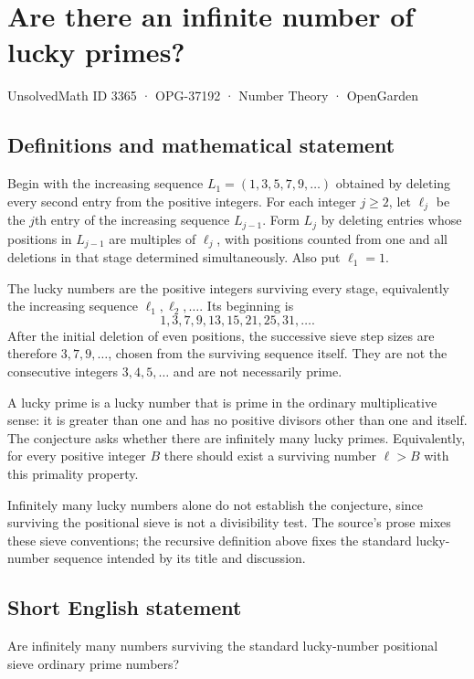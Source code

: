 \documentclass[11pt,a4paper]{article}
\begin{document}
\section*{Are there an infinite number of lucky primes?}\label{3365}
{\small UnsolvedMath ID 3365 · OPG-37192 · Number Theory · OpenGarden}
\subsection{Definitions and mathematical statement}
Begin with the increasing sequence $L_1=(1,3,5,7,9,\ldots)$ obtained by deleting every second entry from the positive integers. For each integer $j\ge2$, let $\ell_j$ be the $j$th entry of the increasing sequence $L_{j-1}$. Form $L_j$ by deleting entries whose positions in $L_{j-1}$ are multiples of $\ell_j$, with positions counted from one and all deletions in that stage determined simultaneously. Also put $\ell_1=1$.

The lucky numbers are the positive integers surviving every stage, equivalently the increasing sequence $\ell_1,\ell_2,\ldots$. Its beginning is
\[
                         1,3,7,9,13,15,21,25,31,\ldots.
\]
After the initial deletion of even positions, the successive sieve step sizes are therefore $3,7,9,\ldots$, chosen from the surviving sequence itself. They are not the consecutive integers $3,4,5,\ldots$ and are not necessarily prime.

A lucky prime is a lucky number that is prime in the ordinary multiplicative sense: it is greater than one and has no positive divisors other than one and itself. The conjecture asks whether there are infinitely many lucky primes. Equivalently, for every positive integer $B$ there should exist a surviving number $\ell>B$ with this primality property.

Infinitely many lucky numbers alone do not establish the conjecture, since surviving the positional sieve is not a divisibility test. The source's prose mixes these sieve conventions; the recursive definition above fixes the standard lucky-number sequence intended by its title and discussion.
\subsection{Short English statement}
Are infinitely many numbers surviving the standard lucky-number positional sieve ordinary prime numbers?
\end{document}
